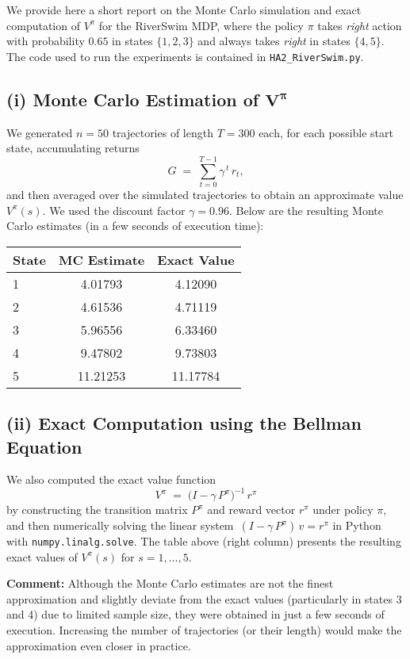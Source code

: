 We provide here a short report on the Monte Carlo simulation and exact computation of 
\(V^\pi\) for the RiverSwim MDP, where the policy \(\pi\) takes \emph{right} action 
with probability \(0.65\) in states \(\{1,2,3\}\) and always takes \emph{right} 
in states \(\{4,5\}\). 
The code used to run the experiments is contained in 
\texttt{HA2\_RiverSwim.py}.

\medskip

\noindent
\subsection*{(i) Monte Carlo Estimation of \(\boldsymbol{V^\pi}\)}

\noindent
We generated \(n=50\) trajectories of length \(T=300\) each, for each possible start state, 
accumulating returns
\[
  G \;=\;\sum_{t=0}^{T-1}\gamma^{\,t}\,r_t,
\]
and then averaged over the simulated trajectories to obtain 
an approximate value \(V^\pi(s)\). 
We used the discount factor \(\gamma = 0.96\). 
Below are the resulting Monte Carlo estimates (in a few seconds of execution time):

\begin{center}
\begin{tabular}{lcc}
\toprule
State & MC Estimate & Exact Value \\ 
\midrule
1 & 4.01793 & 4.12090 \\
2 & 4.61536 & 4.71119 \\
3 & 5.96556 & 6.33460 \\
4 & 9.47802 & 9.73803 \\
5 & 11.21253 & 11.17784 \\
\bottomrule
\end{tabular}
\end{center}

\noindent
\subsection*{(ii) Exact Computation using the Bellman Equation}

\noindent
We also computed the exact value function 
\[
   V^\pi \;=\;\bigl(I - \gamma\,P^\pi\bigr)^{-1}\,r^\pi
\]
by constructing the transition matrix \(P^\pi\) and reward vector \(r^\pi\) under policy 
\(\pi\), and then numerically solving the linear system 
\(\,(I - \gamma\,P^\pi)\,v = r^\pi\) in Python with \texttt{numpy.linalg.solve}. 
The table above (right column) presents the resulting exact values of 
\(V^\pi(s)\) for \(s=1,\dots,5.\)

\medskip

\noindent
\textbf{Comment:} 
Although the Monte Carlo estimates are not the finest approximation and slightly deviate 
from the exact values (particularly in states 3 and 4) due to limited sample size, 
they were obtained in just a few seconds of execution. Increasing the number of trajectories 
(or their length) would make the approximation even closer in practice.
